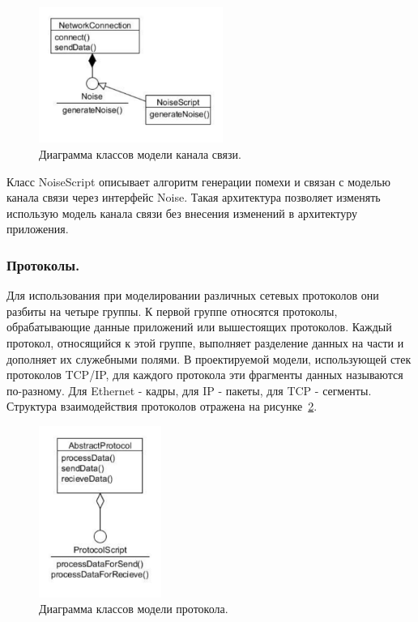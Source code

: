 \documentclass[12pt]{report}
\begin{document}
    \begin{figure}[h!]\center
        \includegraphics[width = 60mm]{Ch3Pic2}
        \caption{Диаграмма классов модели канала связи. } \label{Pic2}
    \end{figure}

    Класс NoiseScript описывает алгоритм генерации помехи и связан с моделью канала связи через интерфейс Noise. Такая архитектура позволяет изменять использую модель канала связи без внесения изменений в архитектуру приложения.

    \subsubsection{Протоколы. }

    Для использования при моделировании различных сетевых протоколов они разбиты на четыре группы. К первой группе относятся протоколы, обрабатывающие данные приложений или вышестоящих протоколов. Каждый протокол, относящийся к этой группе, выполняет разделение данных на части и дополняет их служебными полями. В проектируемой модели, использующей стек протоколов TCP/IP, для каждого протокола эти фрагменты данных называются по-разному. Для Ethernet - кадры, для IP - пакеты, для TCP - сегменты. Структура взаимодействия протоколов отражена на рисунке~\ref{Pic3}.

    \begin{figure}[h!]\center
        \includegraphics[width = 40mm]{Ch3Pic3}
        \caption{Диаграмма классов модели протокола. } \label{Pic3}
    \end{figure}
\end{document}
